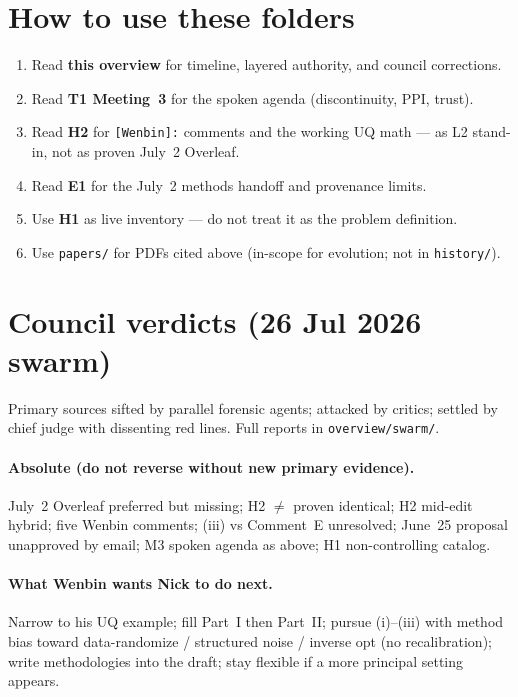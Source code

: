 \documentclass[11pt]{article}
\begin{document}
\section{How to use these folders}
\begin{enumerate}[leftmargin=*]
  \item Read \textbf{this overview} for timeline, layered authority, and council corrections.
  \item Read \textbf{T1 Meeting~3} for the spoken agenda (discontinuity, PPI, trust).
  \item Read \textbf{H2} for \texttt{[Wenbin]:} comments and the working UQ math --- as L2
        stand-in, not as proven July~2 Overleaf.
  \item Read \textbf{E1} for the July~2 methods handoff and provenance limits.
  \item Use \textbf{H1} as live inventory --- do not treat it as the problem definition.
  \item Use \texttt{papers/} for PDFs cited above (in-scope for evolution; not in
        \texttt{history/}).
\end{enumerate}

\section{Council verdicts (26 Jul 2026 swarm)}
Primary sources sifted by parallel forensic agents; attacked by critics; settled by
chief judge with dissenting red lines. Full reports in \texttt{overview/swarm/}.

\paragraph{Absolute (do not reverse without new primary evidence).}
July~2 Overleaf preferred but missing; H2 $\neq$ proven identical; H2 mid-edit hybrid;
five Wenbin comments; (iii) vs Comment~E unresolved; June~25 proposal unapproved by email;
M3 spoken agenda as above; H1 non-controlling catalog.

\paragraph{What Wenbin wants Nick to do next.}
Narrow to his UQ example; fill Part~I then Part~II; pursue (i)--(iii) with method bias toward
data-randomize / structured noise / inverse opt (no recalibration); write methodologies into
the draft; stay flexible if a more principal setting appears.
\end{document}
